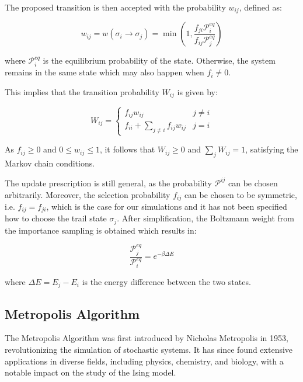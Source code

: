The proposed transition is then accepted with the probability \( w_{ij} \),
defined as:

\begin{equation}
    w_{ij} = w(\sigma_i \rightarrow \sigma_j) = \min \left( 1, \frac{f_{ji} \mathcal{P}^{eq}_i}{f_{ij} \mathcal{P}^{eq}_j} \right)
\end{equation}

where \( \mathcal{P}^{eq}_i \) is the equilibrium probability of the state.
Otherwise, the system remains in the same state which may also happen when \(
f_{i} \neq 0 \).

This implies that the transition probability \( W_{ij} \) is given by:

\begin{equation}
    W_{ij} =
    \begin{cases}
        f_{ij} w_{ij} & j \neq i \\
        f_{ii} + \sum_{j \neq i} f_{ij} w_{ij} & j = i
    \end{cases}
\end{equation}

As $f_{ij} \geq 0$ and $0 \leq w_{ij} \leq 1$, it follows that $W_{ij} \geq 0$
and $\sum_j W_{ij} = 1$, satisfying the Markov chain conditions.

The update prescription is still general, as the probability \( \mathcal{P}^{ij}
\) can be chosen arbitrarily. Moreover, the selection probability \( f_{ij} \)
can be chosen to be symmetric, i.e. \( f_{ij} = f_{ji} \), which is the case for
our simulations and it has not been specified how to choose the trail state \(
\sigma_j \). After simplification, the Boltzmann weight from the importance
sampling is obtained which results in:

\begin{equation}
    \frac{\mathcal{P}_j^{eq}}{\mathcal{P}_i^{eq}} = e^{-\beta \Delta E}
\end{equation}

where \( \Delta E = E_j - E_i \) is the energy difference between the two
states.

\subsection{Metropolis Algorithm}

The Metropolis Algorithm was first introduced by Nicholas Metropolis in 1953,
revolutionizing the simulation of stochastic systems. It has since found
extensive applications in diverse fields, including physics, chemistry, and
biology, with a notable impact on the study of the Ising model.

